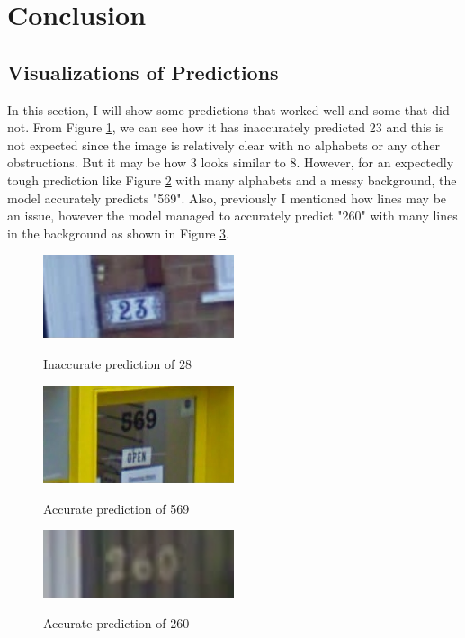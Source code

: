 \documentclass[twoside, column]{article}
\begin{document}

\section{Conclusion}
\subsection{Visualizations of Predictions}

In this section, I will show some predictions that worked well and some that did not. From Figure \ref{image54}, we can see how it has inaccurately predicted 23 and this is not expected since the image is relatively clear with no alphabets or any other obstructions. But it may be how 3 looks similar to 8. However, for an expectedly tough prediction like Figure \ref{image189} with many alphabets and a messy background, the model accurately predicts "569". Also, previously I mentioned how lines may be an issue, however the model managed to accurately predict "260" with many lines in the background as shown in Figure \ref{image24}.

\begin{figure}
\caption{Inaccurate prediction of 28}
\centering
\includegraphics[width=0.5\textwidth]{pred_54}
\label{image54}
\end{figure}

\begin{figure}
\caption{Accurate prediction of 569}
\centering
\includegraphics[width=0.5\textwidth]{pred_182}
\label{image189}
\end{figure}

\begin{figure}
\caption{Accurate prediction of 260}
\centering
\includegraphics[width=0.5\textwidth]{pred_24}
\label{image24}
\end{figure}
\end{document}
